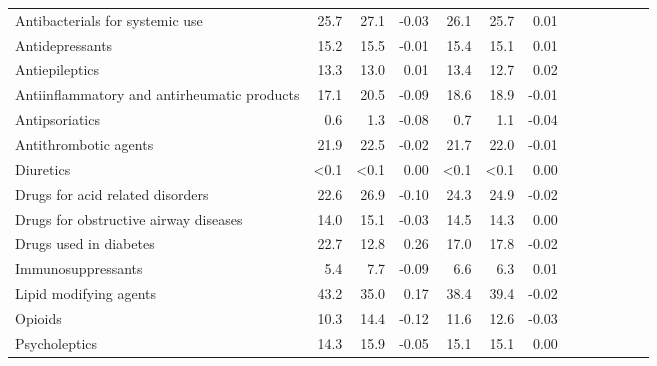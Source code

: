 \documentclass[11pt,]{article}
\begin{document}
\begin{longtable}{lrrrrrrrrrrrr}
      Antibacterials for systemic use & 25.7 & 27.1 & -0.03 & 26.1 & 25.7 &  0.01 \\ 
      Antidepressants & 15.2 & 15.5 & -0.01 & 15.4 & 15.1 &  0.01 \\ 
      Antiepileptics & 13.3 & 13.0 &  0.01 & 13.4 & 12.7 &  0.02 \\ 
      Antiinflammatory and antirheumatic products & 17.1 & 20.5 & -0.09 & 18.6 & 18.9 & -0.01 \\ 
      Antipsoriatics &  0.6 &  1.3 & -0.08 &  0.7 &  1.1 & -0.04 \\ 
      Antithrombotic agents & 21.9 & 22.5 & -0.02 & 21.7 & 22.0 & -0.01 \\ 
      Diuretics & <0.1 & <0.1 &  0.00 & <0.1 & <0.1 &  0.00 \\ 
      Drugs for acid related disorders & 22.6 & 26.9 & -0.10 & 24.3 & 24.9 & -0.02 \\ 
      Drugs for obstructive airway diseases & 14.0 & 15.1 & -0.03 & 14.5 & 14.3 &  0.00 \\ 
      Drugs used in diabetes & 22.7 & 12.8 &  0.26 & 17.0 & 17.8 & -0.02 \\ 
      Immunosuppressants &  5.4 &  7.7 & -0.09 &  6.6 &  6.3 &  0.01 \\ 
      Lipid modifying agents & 43.2 & 35.0 &  0.17 & 38.4 & 39.4 & -0.02 \\ 
      Opioids & 10.3 & 14.4 & -0.12 & 11.6 & 12.6 & -0.03 \\ 
      Psycholeptics & 14.3 & 15.9 & -0.05 & 15.1 & 15.1 &  0.00 \\ 
   \bottomrule\end{longtable}
\clearpage
{}
\end{document}

